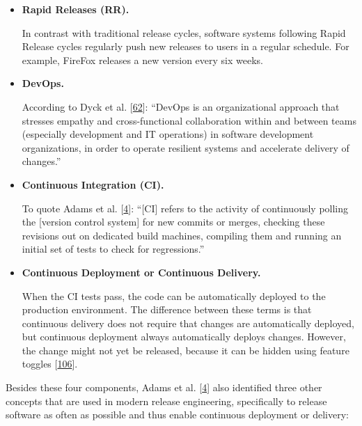 \documentclass[]{book}
\begin{document}
\begin{itemize}
\item
  \textbf{Rapid Releases (RR).}

  In contrast with traditional release cycles, software systems
  following Rapid Release cycles regularly push new releases to users in
  a regular schedule. For example, FireFox releases a new version every
  six weeks.
\item
  \textbf{DevOps.}

  According to Dyck et al. {[}\protect\hyperlink{ref-dyck2015a}{62}{]}:
  ``DevOps is an organizational approach that stresses empathy and
  cross-functional collaboration within and between teams (especially
  development and IT operations) in software development organizations,
  in order to operate resilient systems and accelerate delivery of
  changes.''
\item
  \textbf{Continuous Integration (CI).}

  To quote Adams et al. {[}\protect\hyperlink{ref-adams2016a}{4}{]}:
  ``{[}CI{]} refers to the activity of continuously polling the
  {[}version control system{]} for new commits or merges, checking these
  revisions out on dedicated build machines, compiling them and running
  an initial set of tests to check for regressions.''
\item
  \textbf{Continuous Deployment or Continuous Delivery.}

  When the CI tests pass, the code can be automatically deployed to the
  production environment. The difference between these terms is that
  continuous delivery does not require that changes are automatically
  deployed, but continuous deployment always automatically deploys
  changes. However, the change might not yet be released, because it can
  be hidden using feature toggles
  {[}\protect\hyperlink{ref-laukkanen2018a}{106}{]}.
\end{itemize}

Besides these four components, Adams et al.
{[}\protect\hyperlink{ref-adams2016a}{4}{]} also identified three other
concepts that are used in modern release engineering, specifically to
release software as often as possible and thus enable continuous
deployment or delivery:
\end{document}
